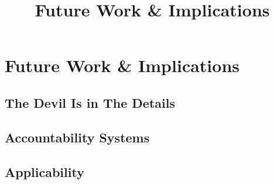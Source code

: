 \documentclass[../../main/main.tex]{subfiles}
\begin{document}
\title{Future Work \& Implications}
\chapter{Future Work \& Implications}\label{chp:future}

\section{The Devil Is in The Details}\label{sec:devil}

\section{Accountability Systems}\label{sec:accountability}

\section{Applicability }\label{sec:applicability }
\end{document}
